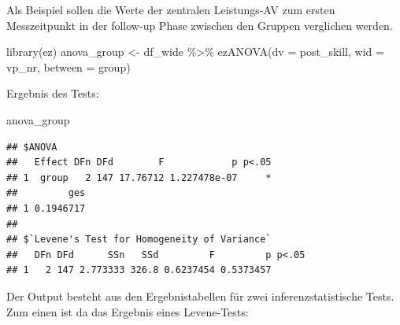 \documentclass[
]{book}
\newenvironment{Shaded}{\begin{snugshade}}{\end{snugshade}}
\newcommand{\AttributeTok}[1]{\textcolor[rgb]{0.77,0.63,0.00}{#1}}
\newcommand{\FunctionTok}[1]{\textcolor[rgb]{0.00,0.00,0.00}{#1}}
\newcommand{\NormalTok}[1]{#1}
\newcommand{\OtherTok}[1]{\textcolor[rgb]{0.56,0.35,0.01}{#1}}
\newcommand{\SpecialCharTok}[1]{\textcolor[rgb]{0.00,0.00,0.00}{#1}}
\newcommand{\StringTok}[1]{\textcolor[rgb]{0.31,0.60,0.02}{#1}}
\begin{document}
Als Beispiel sollen die Werte der zentralen Leistungs-AV zum ersten Messzeitpunkt in der follow-up Phase zwischen den Gruppen verglichen werden.

\begin{Shaded}
\begin{Highlighting}[]
\FunctionTok{library}\NormalTok{(ez)}
\NormalTok{anova\_group }\OtherTok{\textless{}{-}} 
\NormalTok{  df\_wide }\SpecialCharTok{\%\textgreater{}\%} 
  \FunctionTok{ezANOVA}\NormalTok{(}\AttributeTok{dv =}\NormalTok{ post\_skill,}
          \AttributeTok{wid =}\NormalTok{ vp\_nr,}
          \AttributeTok{between =}\NormalTok{ group)}
\end{Highlighting}
\end{Shaded}

Ergebnis des Tests:

\begin{Shaded}
\begin{Highlighting}[]
\NormalTok{anova\_group}
\end{Highlighting}
\end{Shaded}

\begin{verbatim}
## $ANOVA
##   Effect DFn DFd        F            p p<.05
## 1  group   2 147 17.76712 1.227478e-07     *
##         ges
## 1 0.1946717
## 
## $`Levene's Test for Homogeneity of Variance`
##   DFn DFd      SSn   SSd         F         p p<.05
## 1   2 147 2.773333 326.8 0.6237454 0.5373457
\end{verbatim}

Der Output besteht aus den Ergebnistabellen für zwei inferenzstatistische Tests. Zum einen ist da das Ergebnis eines Levene-Tests:

\begin{Shaded}
\end{Shaded}

 
  \providecommand{\huxb}[2]{\arrayrulecolor[RGB]{#1}\global\arrayrulewidth=#2pt}
  \providecommand{\huxvb}[2]{\color[RGB]{#1}\vrule width #2pt}
  \providecommand{\huxtpad}[1]{\rule{0pt}{#1}}
  \providecommand{\huxbpad}[1]{\rule[-#1]{0pt}{#1}}
\end{document}

